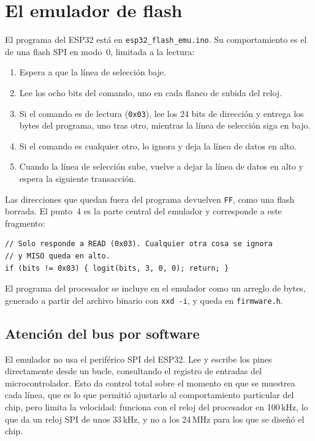 \documentclass[11pt,letterpaper,oneside]{report}
\newcommand{\code}[1]{\texttt{#1}}
\begin{document}
\section{El emulador de flash}

El programa del ESP32 está en \code{esp32\_flash\_emu.ino}. Su comportamiento es el de una flash SPI en modo~0, limitada a la lectura:

\begin{enumerate}
  \item Espera a que la línea de selección baje.
  \item Lee los ocho bits del comando, uno en cada flanco de subida del reloj.
  \item Si el comando es de lectura (\code{0x03}), lee los 24 bits de dirección y entrega los bytes del programa, uno tras otro, mientras la línea de selección siga en bajo.
  \item Si el comando es cualquier otro, lo ignora y deja la línea de datos en alto.
  \item Cuando la línea de selección sube, vuelve a dejar la línea de datos en alto y espera la siguiente transacción.
\end{enumerate}

Las direcciones que quedan fuera del programa devuelven \code{FF}, como una flash borrada. El punto~4 es la parte central del emulador y corresponde a este fragmento:

\begin{lstlisting}
// Solo responde a READ (0x03). Cualquier otra cosa se ignora
// y MISO queda en alto.
if (bits != 0x03) { logit(bits, 3, 0, 0); return; }
\end{lstlisting}

El programa del procesador se incluye en el emulador como un arreglo de bytes, generado a partir del archivo binario con \code{xxd -i}, y queda en \code{firmware.h}.

\subsection{Atención del bus por software}

El emulador no usa el periférico SPI del ESP32. Lee y escribe los pines directamente desde un bucle, consultando el registro de entradas del microcontrolador. Esto da control total sobre el momento en que se muestrea cada línea, que es lo que permitió ajustarlo al comportamiento particular del chip, pero limita la velocidad: funciona con el reloj del procesador en 100\,kHz, lo que da un reloj SPI de unos 33\,kHz, y no a los 24\,MHz para los que se diseñó el chip.
\end{document}
